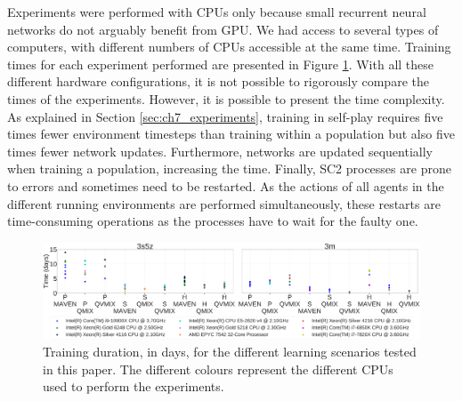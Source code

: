 Experiments were performed with CPUs only because small recurrent neural networks do not arguably benefit from GPU.
We had access to several types of computers, with different numbers of CPUs accessible at the same time.
Training times for each experiment performed are presented in Figure \ref{fig:training_time}.
With all these different hardware configurations, it is not possible to rigorously compare the times of the experiments.
However, it is possible to present the time complexity.
As explained in Section \ref{sec:ch7_experiments}, training in self-play requires five times fewer environment timesteps than training within a population but also five times fewer network updates.
Furthermore, networks are updated sequentially when training a population, increasing the time.
Finally, SC2 processes are prone to errors and sometimes need to be restarted.
As the actions of all agents in the different running environments are performed simultaneously, these restarts are time-consuming operations as the processes have to wait for the faulty one.


\begin{figure}
    \centering
    \includegraphics[width=\textwidth]{figures/ch7/training_time.pdf}
    \caption{Training duration, in days, for the different learning scenarios tested in this paper.
    The different colours represent the different CPUs used to perform the experiments.}
    \label{fig:training_time}
\end{figure}
